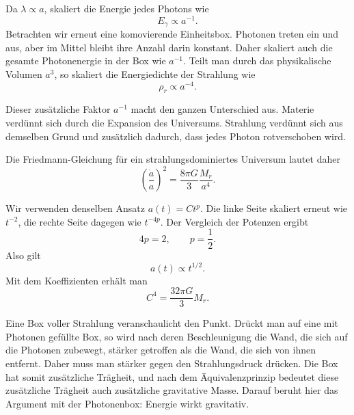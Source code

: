 Da \(\lambda\propto a\), skaliert die Energie jedes Photons wie
\begin{equation}
E_\gamma\propto a^{-1}.
\end{equation}
Betrachten wir erneut eine komovierende Einheitsbox. Photonen treten ein und aus, aber im Mittel bleibt ihre Anzahl darin konstant. Daher skaliert auch die gesamte Photonenergie in der Box wie \(a^{-1}\). Teilt man durch das physikalische Volumen \(a^3\), so skaliert die Energiedichte der Strahlung wie
\begin{equation}
\rho_r\propto a^{-4}.
\end{equation}

Dieser zusätzliche Faktor \(a^{-1}\) macht den ganzen Unterschied aus. Materie verdünnt sich durch die Expansion des Universums. Strahlung verdünnt sich aus demselben Grund und zusätzlich dadurch, dass jedes Photon rotverschoben wird.

Die Friedmann-Gleichung für ein strahlungsdominiertes Universum lautet daher
\begin{equation}
\left(\frac{\dot a}{a}\right)^2=\frac{8\pi G}{3}\frac{M_r}{a^4}.
\end{equation}

Wir verwenden denselben Ansatz \(a(t)=Ct^p\). Die linke Seite skaliert erneut wie \(t^{-2}\), die rechte Seite dagegen wie \(t^{-4p}\). Der Vergleich der Potenzen ergibt
\begin{equation}
4p=2,
\qquad
p=\frac{1}{2}.
\end{equation}
Also gilt
\begin{equation}
a(t)\propto t^{1/2}.
\end{equation}
Mit dem Koeffizienten erhält man
\begin{equation}
C^4=\frac{32\pi G}{3}M_r.
\end{equation}

\begin{classroomqa}\end{classroomqa}

Eine Box voller Strahlung veranschaulicht den Punkt. Drückt man auf eine mit Photonen gefüllte Box, so wird nach deren Beschleunigung die Wand, die sich auf die Photonen zubewegt, stärker getroffen als die Wand, die sich von ihnen entfernt. Daher muss man stärker gegen den Strahlungsdruck drücken. Die Box hat somit zusätzliche Trägheit, und nach dem Äquivalenzprinzip bedeutet diese zusätzliche Trägheit auch zusätzliche gravitative Masse. Darauf beruht hier das Argument mit der Photonenbox: Energie wirkt gravitativ.

